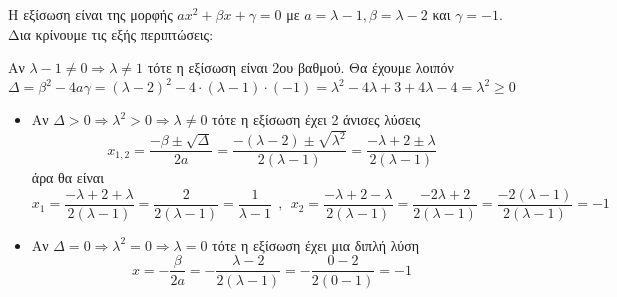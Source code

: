 Η εξίσωση είναι της μορφής $ ax^2+\beta x+\gamma=0 $ με $a=\lambda-1,\beta=\lambda-2$ και $ \gamma=-1 $. Δια κρίνουμε τις εξής περιπτώσεις:
\begin{alist}
\item Αν $\lambda-1\neq 0\Rightarrow \lambda\neq 1$ τότε η εξίσωση είναι 2ου βαθμού. Θα έχουμε λοιπόν
\[\Delta=\beta^2-4a\gamma=(\lambda-2)^2-4\cdot(\lambda-1)\cdot(-1)=\lambda^2-4\lambda+3+4\lambda-4=\lambda^2\geq 0\]
\begin{itemize}
\item Αν $ \Delta>0\Rightarrow \lambda^2>0\Rightarrow \lambda\neq 0 $ τότε η εξίσωση έχει 2 άνισες λύσεις
\[ x_{1,2}=\frac{-\beta\pm\sqrt{\Delta}}{2a}=\frac{-(\lambda-2)\pm\sqrt{\lambda^2}}{2(\lambda-1)}=\frac{-\lambda+2\pm\lambda}{2(\lambda-1)} \]
άρα θα είναι
\[ x_1=\frac{-\lambda+2+\lambda}{2(\lambda-1)}=\frac{2}{2(\lambda-1)}=\frac{1}{\lambda-1}\ \ ,\ \ x_2=\frac{-\lambda+2-\lambda}{2(\lambda-1)}=\frac{-2\lambda+2}{2(\lambda-1)}=\frac{-2(\lambda-1)}{2(\lambda-1)}=-1 \]
\item Αν $ \Delta=0\Rightarrow \lambda^2=0\Rightarrow \lambda=0 $ τότε η εξίσωση έχει μια διπλή λύση
\[ x=-\frac{\beta}{2a}=-\frac{\lambda-2}{2(\lambda-1)}=-\frac{0-2}{2(0-1)}=-1 \]
\end{itemize}
\item 
\end{alist}
